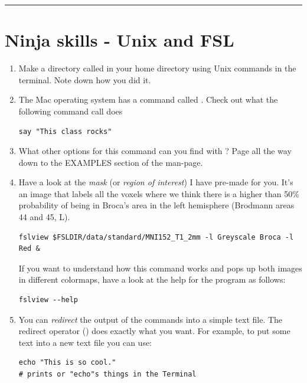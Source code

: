 \hrule

\section{Ninja skills - Unix and FSL}

\begin{enumerate}

\item Make a directory called  in your home directory using Unix commands in the terminal. Note down how you did it.

\item The Mac operating system has a command called . Check out what the following command call does
\begin{lstlisting}
say "This class rocks" 
\end{lstlisting}

\item What other options for this command can you find with ? Page all the way down to the EXAMPLES section of the man-page.

\item Have a look at the \emph{mask} (or \emph{region of interest}) I have pre-made for you. It's an image that labels all the voxels where we think there is a higher than 50\% probability of being in Broca's area in the left hemisphere (Brodmann areas 44 and 45, L).

\begin{small}
\begin{lstlisting}
fslview $FSLDIR/data/standard/MNI152_T1_2mm -l Greyscale Broca -l Red &
\end{lstlisting}
\end{small}

If you want to understand how this command works and pops up both images in different colormaps, have a look at the help for the  program as follows:

\begin{lstlisting}
fslview --help
\end{lstlisting}

\item You can \emph{redirect} the output of the  commands into a simple text file. The redirect operator  (\unix{$>$}) does exactly what you want. For example, to put some text into a new text file you can use:

\begin{lstlisting}
echo "This is so cool."
# prints or "echo"s things in the Terminal


\end{lstlisting}
\end{enumerate}
